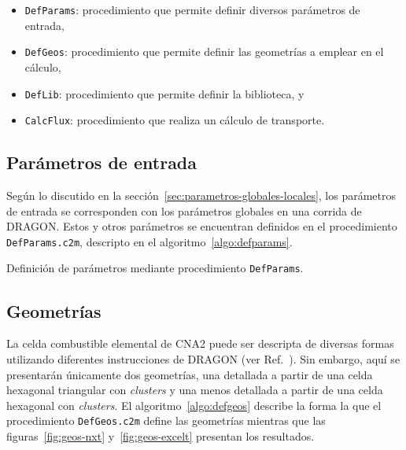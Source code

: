 \documentclass[11pt]{article}
\begin{document}
\begin{itemize}
\renewcommand\labelitemi{$\cdot$}
 \item \texttt{DefParams}: procedimiento que permite definir diversos parámetros de entrada,
 \item \texttt{DefGeos}: procedimiento que permite definir las geometrías a emplear en el cálculo,
 \item \texttt{DefLib}: procedimiento que permite definir la biblioteca, y
 \item \texttt{CalcFlux}: procedimiento que realiza un cálculo de transporte.
\end{itemize}


\subsection{Parámetros de entrada}

Según lo discutido en la sección~\ref{sec:parametros-globales-locales}, los parámetros de entrada se corresponden con los parámetros globales en una corrida de DRAGON. Estos y otros parámetros se encuentran definidos en el procedimiento \texttt{DefParams.c2m}, descripto en el algoritmo~\ref{algo:defparams}.

\medskip
\begin{algorithm}[H]
 
 
 \caption{Definición de parámetros mediante procedimiento \texttt{DefParams}.\label{algo:defparams}}
\end{algorithm}
\medskip


\subsection{Geometrías}

La celda combustible elemental de CNA2 puede ser descripta de diversas formas utilizando diferentes instrucciones de DRAGON (ver Ref.~\cite{geometria-dragon}). Sin embargo, aquí se presentarán únicamente dos geometrías, una detallada a partir de una celda hexagonal triangular con \emph{clusters} y una menos detallada a partir de una celda hexagonal con \emph{clusters}. El algoritmo~\ref{algo:defgeos} describe la forma la que el procedimiento \texttt{DefGeos.c2m} define las geometrías mientras que las figuras~\ref{fig:geos-nxt} y~\ref{fig:geos-excelt} presentan los resultados.
\end{document}
